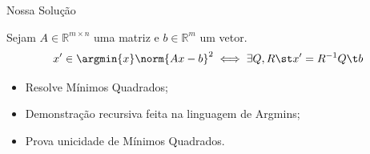 
\begin{frame}{Nossa Solução}
  \begin{theorem}
    Sejam $A \in \mathbb{R}^{m \times n}$ uma matriz e $b \in \mathbb{R}^{m}$ um vetor.
    \[
      x' \in \argmin{x} \norm{Ax - b}^2
      \iff
      \exists Q, R \st x' = R^{-1} Q\t b
    \]
  \end{theorem}

  \pause
  \vspace{0.5cm}

  \begin{itemize}
    \item Resolve Mínimos Quadrados; \\[0.25cm]
    \item Demonstração recursiva feita na linguagem de Argmins; \\[0.25cm]
    \item Prova unicidade de Mínimos Quadrados. %
  \end{itemize}
\end{frame}